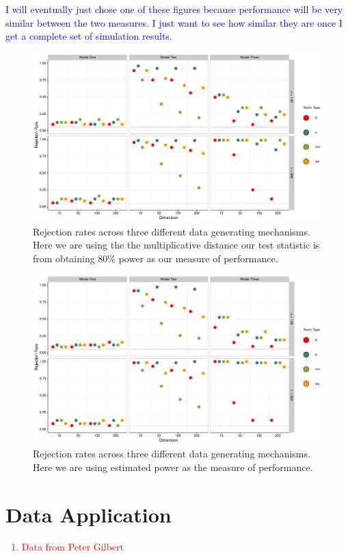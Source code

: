 \documentclass{article}
\newcommand{\sh}{\textcolor{red}}
\begin{document}
\textcolor{blue}{I will eventually just chose one of these figures because performance will be very similar between the two measures.  I just want to see how similar they are once I get a complete set of simulation results.}

\begin{figure}[H]
	\centering
\includegraphics[width = 0.7 \linewidth]{magnitude.pdf}
	\caption{Rejection rates across three different data generating mechanisms.  Here we are using the the multiplicative distance our test statistic is from obtaining 80\% power as our measure of performance.}
	\label{fig:magnitude}
\end{figure}

\begin{figure}[H]
	\centering
\includegraphics[width = 0.7 \linewidth]{power.pdf}
	\caption{Rejection rates across three different data generating mechanisms. Here we are using estimated power as the measure of performance.}
	\label{fig:magnitude}
\end{figure}

\section{Data Application}
\label{sec:data_app} 

\sh{\begin{enumerate}
	\item Data from Peter Gilbert
\end{enumerate}
}
\end{document}
